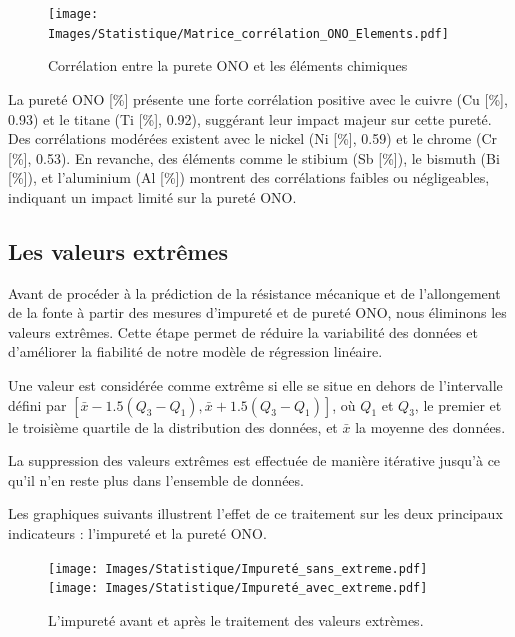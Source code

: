 \documentclass[12pt]{article}
\begin{document}
\begin{figure}[H]
    \texttt{[image: Images/Statistique/Matrice\_corrélation\_ONO\_Elements.pdf]} 
    \caption{Corrélation entre la purete ONO et les éléments chimiques}
    \label{fig:Corrélation3}
\end{figure}

La pureté ONO [\%] présente une forte corrélation positive avec le cuivre 
(Cu [\%], 0.93) et le titane (Ti [\%], 0.92), suggérant leur impact majeur 
sur cette pureté. Des corrélations modérées existent avec le nickel 
(Ni [\%], 0.59) et le chrome (Cr [\%], 0.53). En revanche, des éléments 
comme le stibium (Sb [\%]), le bismuth (Bi [\%]), et l’aluminium (Al [\%]) 
montrent des corrélations faibles ou négligeables, indiquant un impact 
limité sur la pureté ONO.





\subsection{Les valeurs extrêmes}


Avant de procéder à la prédiction de la résistance mécanique et de 
l'allongement de la fonte à partir des mesures d'impureté et de pureté 
ONO, nous éliminons les valeurs extrêmes. Cette étape permet de réduire 
la variabilité des données et d'améliorer la fiabilité de notre modèle 
de régression linéaire.

Une valeur est considérée comme extrême si elle se situe en dehors de 
l'intervalle défini par 
$[\bar{x} - 1.5(Q_3 - Q_1), \bar{x} + 1.5(Q_3 - Q_1)]$, 
où $Q_1$ et $Q_3$, le premier et le troisième quartile 
de la distribution des données, et $\bar{x}$ la moyenne des données.

La suppression des valeurs extrêmes est effectuée de manière itérative 
jusqu'à ce qu'il n'en reste plus dans l'ensemble de données.


Les graphiques suivants illustrent l'effet de ce traitement sur les 
deux principaux indicateurs : l'impureté et la pureté ONO.

\begin{figure}[H]
    \centering
    \begin{adjustbox}{width=1.3\textwidth,center}
        \texttt{[image: Images/Statistique/Impureté\_sans\_extreme.pdf]}
        \texttt{[image: Images/Statistique/Impureté\_avec\_extreme.pdf]}
    \end{adjustbox}
    \caption{L'impureté avant et après le traitement des valeurs extrèmes.}
    \label{fig:ExtremeImpurete}
\end{figure}
\end{document}
